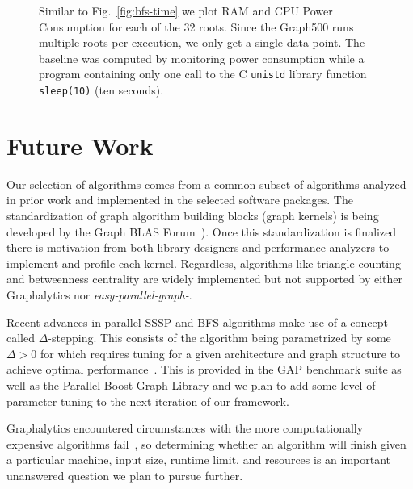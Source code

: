 \documentclass[conference]{IEEEtran}
\begin{document}
\begin{figure}
\begin{minipage}{0.78\linewidth}
	\end{minipage}
	\caption{Similar to Fig.~\ref{fig:bfs-time} we plot RAM and CPU Power Consumption for each of the 32 roots. Since the Graph500 runs multiple roots per execution, we only get a single data point. The baseline was computed by monitoring power consumption while a program containing only one call to the C \texttt{unistd} library function \texttt{sleep(10)} (ten seconds).}
	\label{fig:power}
\end{figure}

\section{Future Work}

Our selection of algorithms comes from a common subset of algorithms analyzed in prior work and implemented in the selected software packages. The standardization of graph algorithm building blocks (graph kernels) is being developed by the Graph BLAS Forum~\cite{Mattson:2013:graphblas}). Once this standardization is finalized there is motivation from both library designers and performance analyzers to implement and profile each kernel. Regardless, algorithms like triangle counting and betweenness centrality are widely implemented but not supported by either Graphalytics nor \emph{easy-parallel-graph\mbox{-\textasteriskcentered}}.

Recent advances in parallel SSSP and BFS algorithms make use of a concept called $\Delta$-stepping. This consists of the algorithm being parametrized by some $\Delta > 0$ for which requires tuning for a given architecture and graph structure to achieve optimal performance~\cite{Panitanarak:2014:SSSPPerf}. This is provided in the GAP benchmark suite as well as the Parallel Boost Graph Library and we plan to add some level of parameter tuning to the next iteration of our framework.

Graphalytics encountered circumstances with the more computationally expensive algorithms fail~\cite{Iosup:2016:Graphalyticstech}, so determining whether an algorithm will finish given a particular machine, input size, runtime limit, and resources is an important unanswered question we plan to pursue further.
\end{document}
